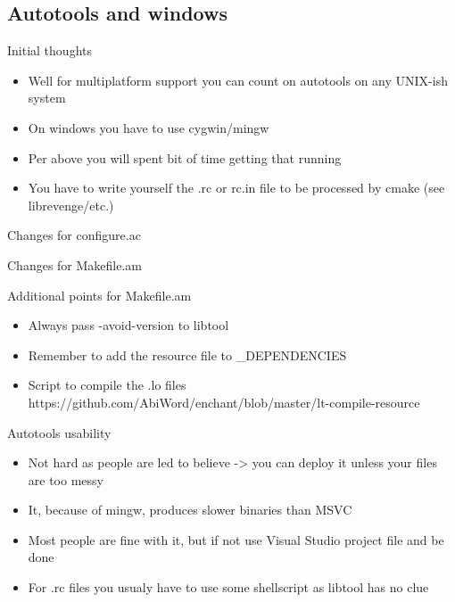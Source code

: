 \documentclass{beamer}
\begin{document}
\subsection{Autotools and windows}

\begin{frame}{Initial thoughts}
    \begin{itemize}
    \item Well for multiplatform support you can count on autotools on any UNIX-ish system
    \item On windows you have to use cygwin/mingw
    \item Per above you will spent bit of time getting that running
    \item You have to write yourself the .rc or rc.in file to be processed by cmake (see librevenge/etc.)
    \end{itemize}
\end{frame}

\begin{frame}[t]{Changes for configure.ac}
	\begin{tiny}
	
	\end{tiny}
\end{frame}

\begin{frame}[t]{Changes for Makefile.am}
	\begin{tiny}
	
	\end{tiny}
\end{frame}

\begin{frame}{Additional points for Makefile.am}
    \begin{itemize}
    \item Always pass -avoid-version to libtool
    \item Remember to add the resource file to \_DEPENDENCIES
    \item Script to compile the .lo files https://github.com/AbiWord/enchant/blob/master/lt-compile-resource
    \end{itemize}
\end{frame}

\begin{frame}{Autotools usability}
    \begin{itemize}
    \item Not hard as people are led to believe -> you can deploy it unless your files are too messy
    \item It, because of mingw, produces slower binaries than MSVC
    \item Most people are fine with it, but if not use Visual Studio project file and be done
    \item For .rc files you usualy have to use some shellscript as libtool has no clue
    \end{itemize}
\end{frame}
\end{document}
